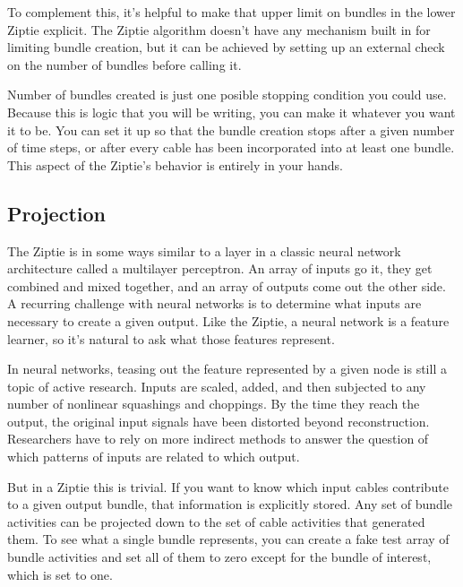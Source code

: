 To complement this, it's helpful to make that upper limit on bundles
in the lower Ziptie explicit. The Ziptie algorithm doesn't have any mechanism
built in for limiting bundle creation, but it can be achieved by setting up
an external check on the number of bundles before calling it.

Number of bundles created is just one posible stopping condition you
could use. Because this is logic that you will be writing, you can make it
whatever you want it to be. You can set it up so that the bundle creation
stops after a given number of time steps, or after every cable
has been incorporated into at least one bundle. This aspect of the Ziptie's
behavior is entirely in your hands.

\subsection{Projection}
\label{subsec:algoprojections}

The Ziptie is in some ways similar to a layer in a classic neural network
architecture called a multilayer perceptron. An array of inputs go it, they
get combined and mixed together, and an array of outputs come out
the other side. A recurring challenge with neural networks is to 
determine what inputs are necessary to create a given output. Like the
Ziptie, a neural network is a feature learner, so it's natural to ask
what those features represent.

In neural networks, teasing out the feature represented by a given node
is still a topic of active research. Inputs
are scaled, added, and then subjected to any number of nonlinear
squashings and choppings. By the time they reach the output, the original
input signals have been distorted beyond reconstruction. Researchers have
to rely on more indirect methods to answer the question of which patterns of
inputs are related to which output.

But in a Ziptie this is trivial. If you want to know which input cables
contribute to a given output bundle, that information is explicitly stored.
Any set of bundle activities can be projected down to the set
of cable activities that generated them.
To see what a single bundle represents, you can create
a fake test array of bundle activities and set all of them to zero except
for the bundle of interest, which is set to one.
